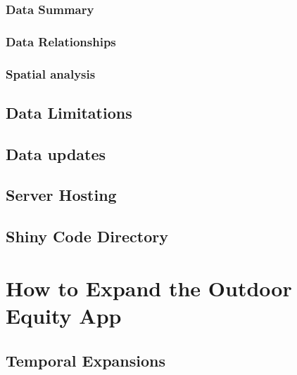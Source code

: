 \documentclass[
]{book}
\begin{document}
\hypertarget{data-summary}{%
\subsubsection{Data Summary}\label{data-summary}}

\hypertarget{data-relationships}{%
\subsubsection{Data Relationships}\label{data-relationships}}

\hypertarget{spatial-analysis}{%
\subsubsection{Spatial analysis}\label{spatial-analysis}}

\hypertarget{data-limitations}{%
\subsection{Data Limitations}\label{data-limitations}}

\hypertarget{data-updates}{%
\subsection{Data updates}\label{data-updates}}

\hypertarget{server-hosting}{%
\subsection{Server Hosting}\label{server-hosting}}

\hypertarget{shiny-code-directory}{%
\subsection{Shiny Code Directory}\label{shiny-code-directory}}

\hypertarget{how-to-expand-the-outdoor-equity-app}{%
\section{How to Expand the Outdoor Equity App}\label{how-to-expand-the-outdoor-equity-app}}

\hypertarget{temporal-expansions}{%
\subsection{Temporal Expansions}\label{temporal-expansions}}
\end{document}
